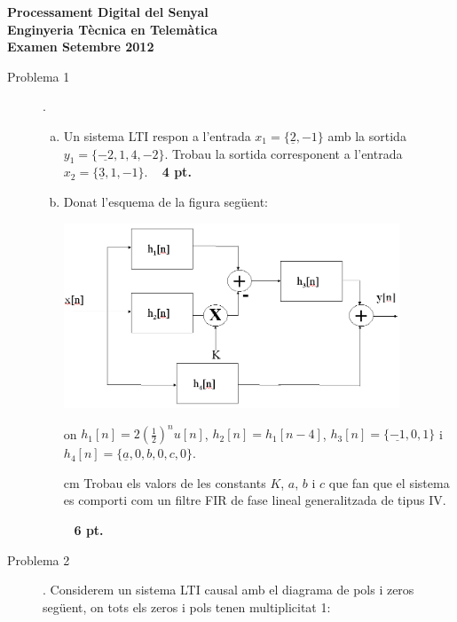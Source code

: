 \documentclass{article}
\begin{document}
\begin{center}
\textbf{\Large Processament Digital del Senyal \\ Enginyeria Tècnica en Telemàtica \\ Examen Setembre 2012}
\end{center}

\begin{description}

\item[Problema 1]. 

\begin{enumerate}[a)]

\item Un sistema LTI respon a l'entrada $x_1=\{\underline{2}, -1\}$ amb la sortida $y_1=\{\underline{-2}, 1, 4, -2\}$.
Trobau la sortida corresponent a l'entrada $x_2=\{\underline{3}, 1, -1\}$.
\ \hfill{\textbf{ 4 pt.}}

\item Donat l'esquema de la figura següent:

\begin{center}
\includegraphics[width=10cm]{esquemaP1.png}
\end{center}

\noindent
on $h_1[n]=2 (\frac{1}{2})^n u[n]$, $h_2[n]=h_1[n-4]$, $h_3[n]=\{ \underline{-1}, 0, 1 \}$
i $h_4[n]=\{ \underline{a}, 0, b, 0, c, 0 \}$.

 cm
\noindent
Trobau els valors de les constants $K$, $a$, $b$ i $c$ que fan que el sistema es comporti com
un filtre FIR de fase lineal generalitzada de tipus IV.

\ \hfill{\textbf{ 6 pt.}}

\end{enumerate}

\vskip 0.5cm


\item[Problema 2].
Considerem un sistema LTI causal amb el diagrama de pols i zeros següent, on tots els zeros i pols tenen multiplicitat 1:


\end{description}
\end{document}
